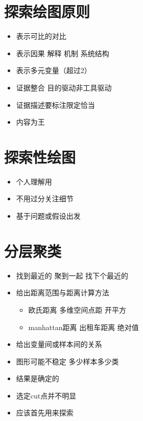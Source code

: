 \documentclass[
]{book}
\providecommand{\tightlist}{%
  \setlength{\itemsep}{0pt}\setlength{\parskip}{0pt}}
\begin{document}
\hypertarget{ux63a2ux7d22ux7ed8ux56feux539fux5219}{%
\section{探索绘图原则}\label{ux63a2ux7d22ux7ed8ux56feux539fux5219}}

\begin{itemize}
\tightlist
\item
  表示可比的对比
\item
  表示因果 解释 机制 系统结构
\item
  表示多元变量（超过2）
\item
  证据整合 目的驱动非工具驱动
\item
  证据描述要标注限定恰当
\item
  内容为王
\end{itemize}

\hypertarget{ux63a2ux7d22ux6027ux7ed8ux56fe}{%
\section{探索性绘图}\label{ux63a2ux7d22ux6027ux7ed8ux56fe}}

\begin{itemize}
\tightlist
\item
  个人理解用
\item
  不用过分关注细节
\item
  基于问题或假设出发
\end{itemize}

\hypertarget{ux5206ux5c42ux805aux7c7b}{%
\section{分层聚类}\label{ux5206ux5c42ux805aux7c7b}}

\begin{itemize}
\tightlist
\item
  找到最近的 聚到一起 找下个最近的
\item
  给出距离范围与距离计算方法

  \begin{itemize}
  \tightlist
  \item
    欧氏距离 多维空间点距 开平方
  \item
    manhattan距离 出租车距离 绝对值
  \end{itemize}
\item
  给出变量间或样本间的关系
\item
  图形可能不稳定 多少样本多少类
\item
  结果是确定的
\item
  选定cut点并不明显
\item
  应该首先用来探索
\end{itemize}
\end{document}
